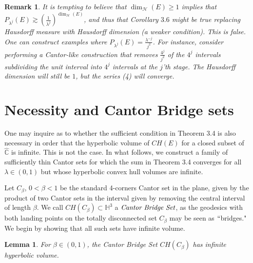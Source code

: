 \documentclass[11pt]{article}
\newtheorem{lm}[tm]{Lemma}
\newtheorem{rmk}[tm]{Remark}
\newcommand\comp{{\mathbb{C}}}
\begin{document}
\begin{rmk}
    It is tempting to believe that $\dim_\mathcal{H}(E) \geq 1$ implies that $P_{\lambda^j}(E) \gtrsim (\frac{1}{\lambda^j})^{\dim_\mathcal{H}(E)}$, and thus that Corollary $3.6$ might be true replacing Hausdorff measure with Hausdorff dimension (a weaker condition). This is false. One can construct examples where $P_{\lambda^j}(E) = \frac{\lambda^{-j}}{j^2}$. For instance, consider performing a Cantor-like construction that removes $\frac{4^j}{j^2}$ of the $4^j$ intervals subdividing the unit interval into $4^j$ intervals at the $j$'th stage. The Hausdorff dimension will still be $1$, but the series (4) will converge.
\end{rmk}

\section{Necessity and Cantor Bridge sets}

One may inquire as to whether the sufficient condition in Theorem 3.4 is also necessary in order that the hyperbolic volume of $CH(E)$ for a closed subset of $\hat{\comp}$ is infinite. This is not the case. In what follows, we construct a family of sufficiently thin Cantor sets for which the sum in Theorem 3.4 converges for all $\lambda \in (0,1)$ but whose hyperbolic convex hull volumes are infinite. 

\bigskip

Let $C_\beta$, $0 < \beta < 1$ be the standard 4-corners Cantor set in the plane, given by the product of two Cantor sets in the interval given by removing the central interval of length $\beta$. We call $CH(C_\beta) \subset \mathbb{H}^3$ a $\emph{Cantor Bridge Set}$, as the geodesics with both landing points on the totally disconnected set $C_\beta$ may be seen as $``$bridges." We begin by showing that all such sets have infinite volume.

\begin{lm}
    For $\beta \in (0,1)$, the Cantor Bridge Set $CH(C_\beta)$ has infinite hyperbolic volume.
\end{lm}
\end{document}
